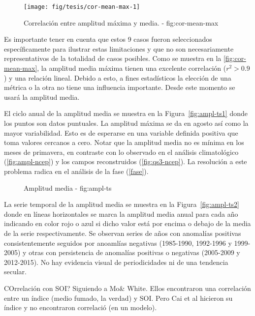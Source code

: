 \documentclass[spanish,a4paper,12p]{book}
\begin{document}
\begin{figure*}
\texttt{[image: fig/tesis/cor-mean-max-1]} \caption{Correlación entre amplitud máxima y media. - fig:cor-mean-max}\label{fig:cor-mean-max}
\end{figure*}

Es importante tener en cuenta que estos 9 casos fueron seleccionados
específicamente para ilustrar estas limitaciones y que no son
necesariamente representativos de la totalidad de casos posibles. Como
se muestra en la \autoref{fig:cor-mean-max}, la amplitud media máxima
tienen una excelente correlación (\(r^2>0.9\)) y una relación lineal.
Debido a esto, a fines estadísticos la elección de una métrica o la otra
no tiene una influencia importante. Desde este momento se usará la
amplitud media.

El ciclo anual de la amplitud media se muestra en la
Figura~\ref{fig:ampl-ts1} donde los puntos son datos puntuales. La
amplitud máxima se da en agosto así como la mayor variabilidad. Esto es
de esperarse en una variable definida positiva que toma valores cercanos
a cero. Notar que la amplitud media no es mínima en los meses de
primavera, en contraste con lo observado en el análisis climatológico
(\autoref{fig:ampl-ncep}) y los campos reconstruidos
(\autoref{fig:qs3-ncep}). La resolución a este problema radica en el
análisis de la fase (\autoref{fase}).

\begin{figure*}
\newline{}\caption{Amplitud media - fig:ampl-ts}\label{fig:ampl-ts}
\end{figure*}

La serie temporal de la amplitud media se muestra en la
Figura~\ref{fig:ampl-ts2} donde en líneas horizontales se marca la
amplitud media anual para cada año indicando en color rojo o azul si
dicho valor está por encima o debajo de la media de la serie
respectivamente. Se observan series de años con anomalías positivas
consistentemente seguidos por anoamlías negativas (1985-1990, 1992-1996
y 1999-2005) y otras con persistencia de anomalías positivas o negativas
(2005-2009 y 2012-2015). No hay evidencia visual de periodicidades ni de
una tendencia secular.

COrrelación con SOI? Siguiendo a Mo\& White. Ellos encontraron una
correlación entre un índice (medio fumado, la verdad) y SOI. Pero Cai et
al hicieron su índice y no encontraron correlació (en un modelo).
\end{document}
